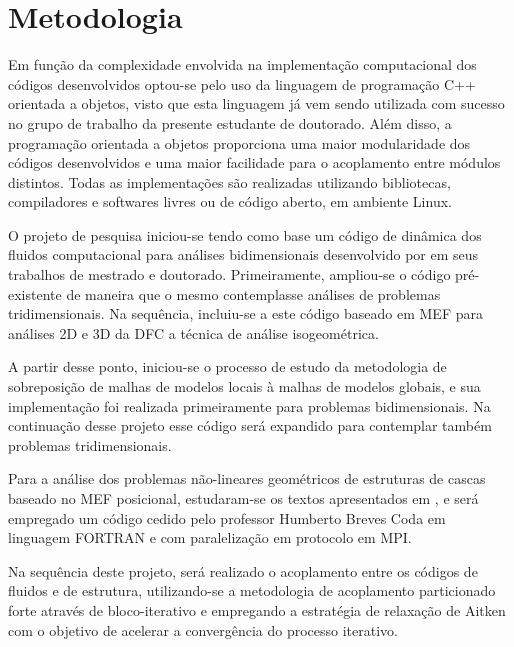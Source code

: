 \documentclass[tese_patricia.tex]{subfiles}
\begin{document}
\section[Metodologia]{Metodologia} 

Em função da complexidade envolvida na implementação computacional dos códigos desenvolvidos optou-se pelo uso da linguagem de programação C++ orientada a objetos, visto que esta linguagem já vem sendo utilizada com sucesso no grupo de trabalho da presente estudante de doutorado. Além disso, a programação orientada a objetos proporciona uma maior modularidade dos códigos desenvolvidos e uma maior facilidade para o acoplamento entre módulos distintos.  Todas as implementações são realizadas utilizando bibliotecas, compiladores e softwares livres ou de código aberto, em ambiente Linux.

O projeto de pesquisa iniciou-se tendo como base um código de dinâmica dos fluidos computacional para análises bidimensionais desenvolvido por  em seus trabalhos de mestrado e doutorado. Primeiramente, ampliou-se o código pré-existente de maneira que o mesmo contemplasse análises de problemas tridimensionais. Na sequência, incluiu-se a este código baseado em MEF para análises 2D e 3D da DFC a técnica de análise isogeométrica.

A partir desse ponto, iniciou-se o processo de estudo da metodologia de sobreposição de malhas de modelos locais à malhas de modelos globais, e sua implementação foi realizada primeiramente para problemas bidimensionais. Na continuação desse projeto esse código será expandido para contemplar também problemas tridimensionais.

Para a análise dos problemas não-lineares geométricos de estruturas de cascas baseado no MEF posicional, estudaram-se os textos apresentados em , e será empregado um código cedido pelo professor Humberto Breves Coda em linguagem FORTRAN e com paralelização em protocolo em MPI.

Na sequência deste projeto, será realizado o acoplamento entre os códigos de fluidos e de estrutura, utilizando-se a metodologia de acoplamento particionado forte através de bloco-iterativo e empregando a estratégia de relaxação de Aitken com o objetivo de acelerar a convergência do processo iterativo.
\end{document}
